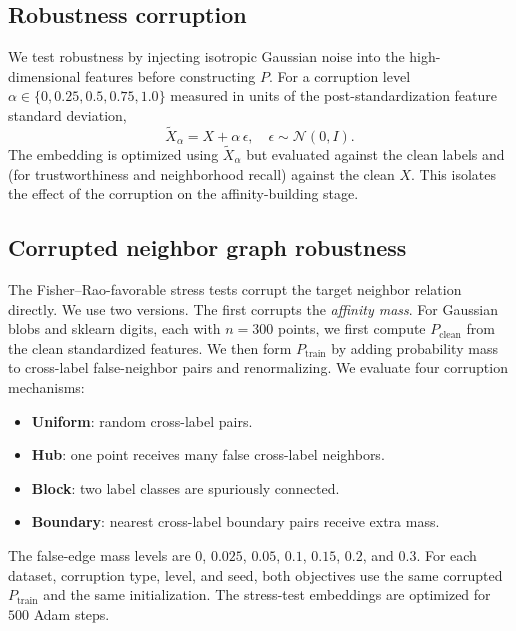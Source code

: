 \documentclass[11pt]{article}
\begin{document}
\subsection{Robustness corruption}
\label{sec:robustness}

We test robustness by injecting isotropic Gaussian noise into the high-dimensional features
before constructing $P$. For a corruption level $\alpha\in\{0,0.25,0.5,0.75,1.0\}$ measured in
units of the post-standardization feature standard deviation,
\begin{equation}
  \widetilde{X}_\alpha = X + \alpha\,\epsilon,\quad \epsilon\sim\mathcal{N}(0,I).
\end{equation}
The embedding is optimized using $\widetilde{X}_\alpha$ but evaluated against the clean labels
and (for trustworthiness and neighborhood recall) against the clean $X$. This isolates the
effect of the corruption on the affinity-building stage.

\subsection{Corrupted neighbor graph robustness}
\label{sec:structured-affinity-method}

The Fisher--Rao-favorable stress tests corrupt the target neighbor relation directly. We use
two versions. The first corrupts the \emph{affinity mass}. For Gaussian blobs and sklearn
digits, each with $n=300$ points, we first compute $P_{\mathrm{clean}}$ from the clean
standardized features. We then form $P_{\mathrm{train}}$ by adding probability mass to
cross-label false-neighbor pairs and renormalizing. We evaluate four corruption mechanisms:
\begin{itemize}
  \item \textbf{Uniform}: random cross-label pairs.
  \item \textbf{Hub}: one point receives many false cross-label neighbors.
  \item \textbf{Block}: two label classes are spuriously connected.
  \item \textbf{Boundary}: nearest cross-label boundary pairs receive extra mass.
\end{itemize}
The false-edge mass levels are $0$, $0.025$, $0.05$, $0.1$, $0.15$, $0.2$, and $0.3$. For
each dataset, corruption type, level, and seed, both objectives use the same corrupted
$P_{\mathrm{train}}$ and the same initialization. The stress-test embeddings are optimized for
$500$ Adam steps.
\end{document}
